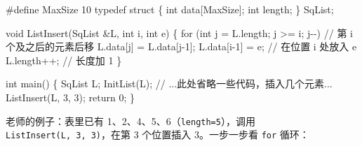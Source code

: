 \documentclass[10.5pt,a4paper,oneside]{article}
\newenvironment{Shaded}{}{}
\newcommand{\CommentTok}[1]{\textcolor[rgb]{0.18,0.55,0.23}{#1}}
\newcommand{\ControlFlowTok}[1]{\textcolor[rgb]{0.12,0.31,0.71}{#1}}
\newcommand{\DataTypeTok}[1]{\textcolor[rgb]{0.12,0.31,0.71}{#1}}
\newcommand{\DecValTok}[1]{\textcolor[rgb]{0.77,0.35,0.07}{#1}}
\newcommand{\KeywordTok}[1]{\textcolor[rgb]{0.12,0.31,0.71}{#1}}
\newcommand{\NormalTok}[1]{#1}
\newcommand{\OperatorTok}[1]{\textcolor[rgb]{0.20,0.20,0.20}{#1}}
\newcommand{\PreprocessorTok}[1]{\textcolor[rgb]{0.44,0.19,0.63}{#1}}
\begin{document}
\begin{Shaded}
\begin{Highlighting}[]
\PreprocessorTok{\#define MaxSize }\DecValTok{10}
\KeywordTok{typedef} \KeywordTok{struct} \OperatorTok{\{}
    \DataTypeTok{int}\NormalTok{ data}\OperatorTok{[}\NormalTok{MaxSize}\OperatorTok{];}
    \DataTypeTok{int}\NormalTok{ length}\OperatorTok{;}
\OperatorTok{\}}\NormalTok{ SqList}\OperatorTok{;}

\DataTypeTok{void}\NormalTok{ ListInsert}\OperatorTok{(}\NormalTok{SqList }\OperatorTok{\&}\NormalTok{L}\OperatorTok{,} \DataTypeTok{int}\NormalTok{ i}\OperatorTok{,} \DataTypeTok{int}\NormalTok{ e}\OperatorTok{)} \OperatorTok{\{}
    \ControlFlowTok{for} \OperatorTok{(}\DataTypeTok{int}\NormalTok{ j }\OperatorTok{=}\NormalTok{ L}\OperatorTok{.}\NormalTok{length}\OperatorTok{;}\NormalTok{ j }\OperatorTok{\textgreater{}=}\NormalTok{ i}\OperatorTok{;}\NormalTok{ j}\OperatorTok{{-}{-})}   \CommentTok{// 第 i 个及之后的元素后移}
\NormalTok{        L}\OperatorTok{.}\NormalTok{data}\OperatorTok{[}\NormalTok{j}\OperatorTok{]} \OperatorTok{=}\NormalTok{ L}\OperatorTok{.}\NormalTok{data}\OperatorTok{[}\NormalTok{j}\OperatorTok{{-}}\DecValTok{1}\OperatorTok{];}
\NormalTok{    L}\OperatorTok{.}\NormalTok{data}\OperatorTok{[}\NormalTok{i}\OperatorTok{{-}}\DecValTok{1}\OperatorTok{]} \OperatorTok{=}\NormalTok{ e}\OperatorTok{;}                       \CommentTok{// 在位置 i 处放入 e}
\NormalTok{    L}\OperatorTok{.}\NormalTok{length}\OperatorTok{++;}                            \CommentTok{// 长度加 1}
\OperatorTok{\}}

\DataTypeTok{int}\NormalTok{ main}\OperatorTok{()} \OperatorTok{\{}
\NormalTok{    SqList L}\OperatorTok{;}
\NormalTok{    InitList}\OperatorTok{(}\NormalTok{L}\OperatorTok{);}
    \CommentTok{// ...此处省略一些代码，插入几个元素...}
\NormalTok{    ListInsert}\OperatorTok{(}\NormalTok{L}\OperatorTok{,} \DecValTok{3}\OperatorTok{,} \DecValTok{3}\OperatorTok{);}
    \ControlFlowTok{return} \DecValTok{0}\OperatorTok{;}
\OperatorTok{\}}
\end{Highlighting}
\end{Shaded}

老师的例子：表里已有 1、2、4、5、6（\texttt{length=5}），调用
\texttt{ListInsert(L,\ 3,\ 3)}，在第 3 个位置插入 3。一步一步看
\texttt{for} 循环：
\end{document}
